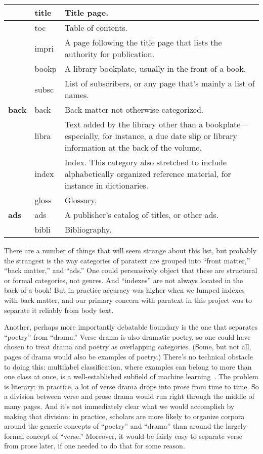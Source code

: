 \documentclass[paper=a4, fontsize=12pt]{scrartcl}
\numberwithin{equation}{section}		%
\numberwithin{figure}{section}			%
\numberwithin{table}{section}				%
\begin{document}
\begin{center}
\begin{longtable}{ | l | l | p{10cm} |}
& title & Title page.  \\ \hline
& toc & Table of contents.  \\ \hline
& impri & A page following the title page that lists the authority for publication.  \\ \hline
& bookp & A library bookplate, usually in the front of a book.  \\ \hline
& subsc & List of subscribers, or any page that's mainly a list of names.  \\ \hline
\textbf{back} & back & Back matter not otherwise categorized.  \\ \hline
& libra & Text added by the library other than a bookplate---especially, for instance, a due date slip or library information at the back of the volume.  \\ \hline
& index & Index. This category also stretched to include alphabetically organized reference material, for instance in dictionaries. \\ \hline
& gloss & Glossary.  \\ \hline
\textbf{ads} & ads & A publisher's catalog of titles, or other ads.  \\ \hline
& bibli & Bibliography.  \\ \hline
\end{longtable}
\end{center}

There are a number of things that will seem strange about this list, but probably the strangest is the way categories of paratext are grouped into ``front matter,'' ``back matter,'' and ``ads.'' One could persuasively object that these are structural or formal categories, not genres. And ``indexes'' are not always located in the back of a book! But in practice accuracy was higher when we lumped indexes with back matter, and our primary concern with paratext in this project was to separate it reliably from body text.

Another, perhaps more importantly debatable boundary is the one that separates ``poetry'' from ``drama.'' Verse drama is also dramatic poetry, so one could have chosen to treat drama and poetry as overlapping categories. (Some, but not all, pages of drama would also be examples of poetry.) There's no technical obstacle to doing this: multilabel classification, where examples can belong to more than one class at once, is a well-established subfield of machine learning~\cite{tsoumakas:multilabel}. The problem is literary: in practice, a lot of verse drama drops into prose from time to time. So a division between verse and prose drama would run right through the middle of many pages. And it's not immediately clear what we would accomplish by making that division: in practice, scholars are more likely to organize corpora around the generic concepts of ``poetry'' and ``drama'' than around the largely-formal concept of ``verse.'' Moreover, it would be fairly easy to separate verse from prose later, if one needed to do that for some reason.
\end{document}
